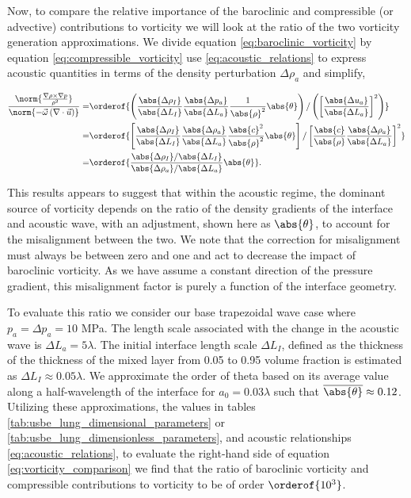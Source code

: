 Now, to compare the relative importance of the baroclinic and
compressible (or advective) contributions to vorticity we will look
at the ratio of the two vorticity generation approximations. We
divide equation \eqref{eq:baroclinic_vorticity} by equation
\eqref{eq:compressible_vorticity} use \eqref{eq:acoustic_relations} to
express acoustic quantities in terms of the density perturbation
$\Delta \rho_a$ and simplify,

\begin{align} \label{eq:vorticity_comparison}
\frac{\norm{\frac{\nabla\rho\times\nabla p}{\rho^2}}}{\norm{-\vec{\omega}\left(\nabla\cdot\vec{u}\right)}} =&%
\orderof{\left(\frac{\abs{\Delta \rho_I}}{\abs{\Delta L_I}}\frac{\abs{\Delta p_a}}{\abs{\Delta L_a}}\frac{1}{\abs{\rho}^2}\abs{\theta}\right) /%
\left( \left[\frac{\abs{\Delta u_a}}{\abs{\Delta L_a}}\right]^2 \right)}\nonumber\\%
%
=&\orderof{\left[\frac{\abs{\Delta \rho_I}}{\abs{\Delta L_I}}\frac{\abs{\Delta \rho_a}}{\abs{\Delta L_a}}\frac{\abs{c}^2}{\abs{\rho}^2}\abs{\theta}\right] /
\left[\frac{\abs{c}}{\abs{\rho}}\frac{\abs{\Delta \rho_a}}{\abs{\Delta L_a}}\right]^2}\nonumber\\%
%
=&\orderof{\frac{\abs{\Delta \rho_I}/\abs{\Delta L_I}}{\abs{\Delta \rho_a}/\abs{\Delta L_a}} \abs{\theta} }.
\end{align}

This results appears to suggest that within the acoustic regime, the
dominant source of vorticity depends on the ratio of the density
gradients of the interface and acoustic wave, with an adjustment,
shown here as $\abs{\theta}$, to account for the misalignment between
the two. We note that the correction for misalignment must always be
between zero and one and act to decrease the impact of baroclinic
vorticity. As we have assume a constant direction of the pressure
gradient, this misalignment factor is purely a function of the
interface geometry.

To evaluate this ratio we consider our base trapezoidal wave case
where $p_a = \Delta p_a = 10$ MPa. The length scale associated with
the change in the acoustic wave is $\Delta L_a=5\lambda$. The initial
interface length scale $\Delta L_I$, defined as the thickness of the
thickness of the mixed layer from 0.05 to 0.95 volume fraction is
estimated as $\Delta L_I \approx 0.05\lambda$. We approximate the
order of theta based on its average value along a half-wavelength of
the interface for $a_0=0.03\lambda$ such that
$\overline{\abs{\theta}}\approx0.12$. Utilizing these approximations,
the values in tables \ref{tab:usbe_lung_dimensional_parameters} or
\ref{tab:usbe_lung_dimensionless_parameters}, and acoustic
relationships \eqref{eq:acoustic_relations}, to evaluate the
right-hand side of equation \eqref{eq:vorticity_comparison} we find
that the ratio of baroclinic vorticity and compressible contributions
to vorticity to be of order $\orderof{10^3}$.


